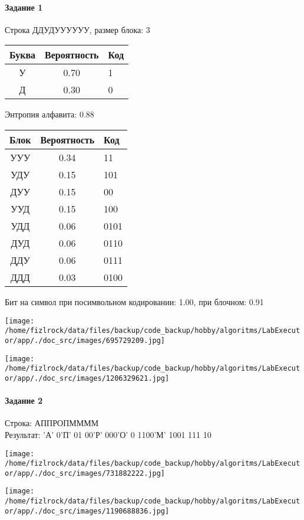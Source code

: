 \documentclass[a4paper, 12pt]{article}
\begin{document}
\paragraph{Задание 1}

Строка ДДУДУУУУУУ, размер блока: 3
\begin{center}
 \begin{tabular}{ |c|c|l| } 
  \hline
     Буква & Вероятность & Код\\ \hline
У & 0.70 & 1\\\hline
Д & 0.30 & 0
\\ \hline \end{tabular}
\end{center}
Энтропия алфавита: 0.88
\begin{center}
 \begin{tabular}{ |c|c|l| } 
  \hline
     Блок & Вероятность & Код\\ \hline
УУУ & 0.34 & 11\\\hline
УДУ & 0.15 & 101\\\hline
ДУУ & 0.15 & 00\\\hline
УУД & 0.15 & 100\\\hline
УДД & 0.06 & 0101\\\hline
ДУД & 0.06 & 0110\\\hline
ДДУ & 0.06 & 0111\\\hline
ДДД & 0.03 & 0100
\\ \hline \end{tabular}
\end{center}
Бит на символ при посимвольном кодировании: 1.00, при блочном: 0.91

\texttt{[image: /home/fizlrock/data/files/backup/code\_backup/hobby/algoritms/LabExecutor/app/./doc\_src/images/695729209.jpg]}

\texttt{[image: /home/fizlrock/data/files/backup/code\_backup/hobby/algoritms/LabExecutor/app/./doc\_src/images/1206329621.jpg]}
\pagebreak
\paragraph{Задание 2}

Строка: 
АППРОПММММ\\
Результат: 'А' 0'П' 01 00'Р' 000'О' 0 1100'М' 1001 111 10

\texttt{[image: /home/fizlrock/data/files/backup/code\_backup/hobby/algoritms/LabExecutor/app/./doc\_src/images/731882222.jpg]}

\texttt{[image: /home/fizlrock/data/files/backup/code\_backup/hobby/algoritms/LabExecutor/app/./doc\_src/images/1190688836.jpg]}
\end{document}
